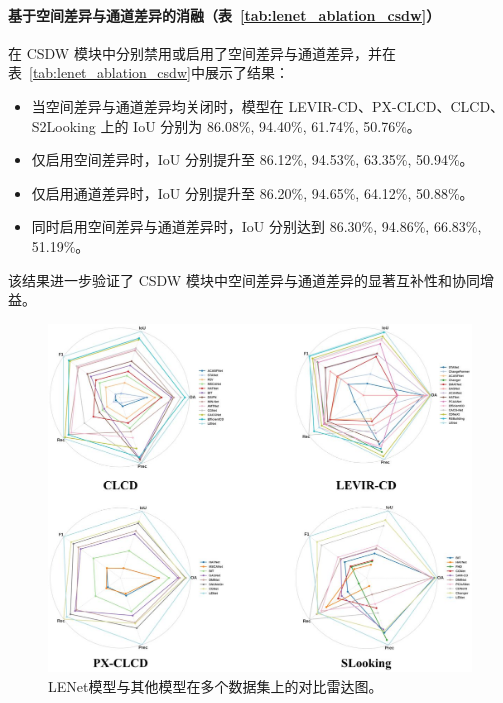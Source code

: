 \paragraph{基于空间差异与通道差异的消融（表~\ref{tab:lenet_ablation_csdw}）}
在 CSDW 模块中分别禁用或启用了空间差异与通道差异，并在表~\ref{tab:lenet_ablation_csdw}中展示了结果：  
\begin{itemize}
  \item 当空间差异与通道差异均关闭时，模型在 LEVIR-CD、PX-CLCD、CLCD、S2Looking 上的 IoU 分别为 86.08\%, 94.40\%, 61.74\%, 50.76\%。
  \item 仅启用空间差异时，IoU 分别提升至 86.12\%, 94.53\%, 63.35\%, 50.94\%。
  \item 仅启用通道差异时，IoU 分别提升至 86.20\%, 94.65\%, 64.12\%, 50.88\%。
  \item 同时启用空间差异与通道差异时，IoU 分别达到 86.30\%, 94.86\%, 66.83\%, 51.19\%。
\end{itemize}
该结果进一步验证了 CSDW 模块中空间差异与通道差异的显著互补性和协同增益。


\begin{figure}[!htb]
  \centering
  \includegraphics[width=\textwidth]{paper_figures/基于双时相遥感影像特征交互的变化检测算法研究/LENet/lenet_rader.png}
  \caption{LENet模型与其他模型在多个数据集上的对比雷达图。}
  \label{fig:lenet_rader}
\end{figure}



